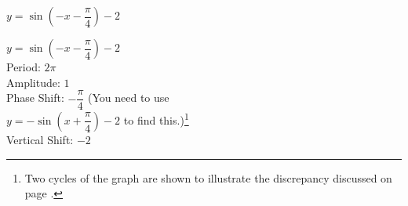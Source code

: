 {$y = \sin \left( -x - \dfrac{\pi}{4} \right) - 2$}
{$y = \sin \left( -x - \dfrac{\pi}{4} \right) - 2$ \\
Period: $2\pi$\\
Amplitude: $1$\\
Phase Shift: $-\dfrac{\pi}{4}$ (You need to use \\ \vspace*{.1in}
$y = -\sin \left( x + \dfrac{\pi}{4} \right) - 2 $ to find this.)\footnote{Two cycles of the graph are shown to illustrate the discrepancy discussed on page \pageref{phaseshiftissue}.}\\
Vertical Shift: $-2$

\begin{center}
\end{center}
}
